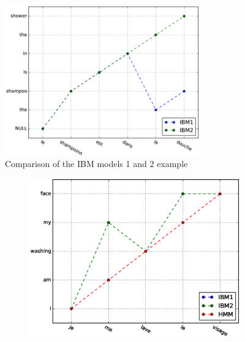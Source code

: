 \documentclass[final]{beamer}
\begin{document}
\begin{frame}[t]
\begin{multicols}{3}
\begin{figure}
\centering
\includegraphics[width=0.75\columnwidth, height=.7\columnwidth]{figures/ibm1_2.png}
\caption{Comparison of the IBM models 1 and 2 example }
\label{fig:ibm}
\end{figure}
\begin{figure}
\centering
\begin{subfigure}{.80\columnwidth}
  \centering
  \includegraphics[width=.99\linewidth]{figures/figures_final/sentence3.eps}
\end{subfigure}%


\end{figure}
\end{multicols}
\end{frame}
\end{document}
